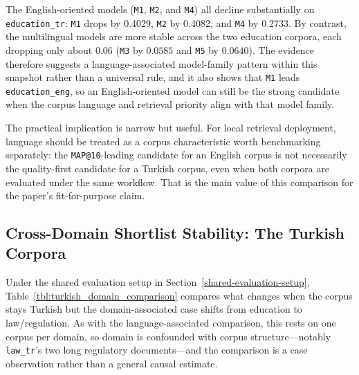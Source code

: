 The English-oriented models (\texttt{M1}, \texttt{M2}, and \texttt{M4}) all decline substantially on \texttt{education\_tr}: \texttt{M1} drops by 0.4029, \texttt{M2} by 0.4082, and \texttt{M4} by 0.2733. By contrast, the multilingual models are more stable across the two education corpora, each dropping only about 0.06 (\texttt{M3} by $0.0585$ and \texttt{M5} by $0.0640$). The evidence therefore suggests a language-associated model-family pattern within this snapshot rather than a universal rule, and it also shows that \texttt{M1} leads \texttt{education\_eng}, so an English-oriented model can still be the strong candidate when the corpus language and retrieval priority align with that model family.

The practical implication is narrow but useful. For local retrieval deployment, language should be treated as a corpus characteristic worth benchmarking separately: the \texttt{MAP@10}-leading candidate for an English corpus is not necessarily the quality-first candidate for a Turkish corpus, even when both corpora are evaluated under the same workflow. That is the main value of this comparison for the paper's fit-for-purpose claim.

\begin{table}[htbp]
\caption{Language-associated \texttt{MAP@10} comparison within the education-domain corpora.}\label{tbl:language_effect_comparison}
\centering
\small

\end{table}

\subsection{Cross-Domain Shortlist Stability: The Turkish Corpora}\label{domain-effect-within-turkish}

Under the shared evaluation setup in Section~\ref{shared-evaluation-setup}, Table~\ref{tbl:turkish_domain_comparison} compares what changes when the corpus stays Turkish but the domain-associated case shifts from education to law/regulation. As with the language-associated comparison, this rests on one corpus per domain, so domain is confounded with corpus structure---notably \texttt{law\_tr}'s two long regulatory documents---and the comparison is a case observation rather than a general causal estimate.

\begin{table}[htbp]
\caption{Domain-associated \texttt{MAP@10} comparison within the Turkish corpora.}\label{tbl:turkish_domain_comparison}
\centering
\small

\end{table}

